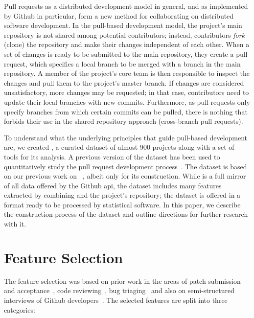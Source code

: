\documentclass{sig-alternate}
\begin{document}
Pull requests as a distributed development model in general, and as implemented
by Github in particular, form a new method for collaborating on distributed
software development. In the pull-based development model, the project's main
repository is not shared among potential contributors; instead, contributors
\emph{fork} (clone) the repository and make their changes independent of each
other. When a set of changes is ready to be submitted to the main repository,
they create a pull request, which specifies a local branch to be merged with a
branch in the main repository. A member of the project's core team is then
responsible to inspect the changes and pull them to the project's master branch.
If changes are considered unsatisfactory, more changes may be requested; in that
case, contributors need to update their local branches with new commits.
Furthermore, as pull requests only specify branches from which certain commits
can be pulled, there is nothing that forbids their use in the shared 
repository approach (cross-branch pull requests).

To understand what the underlying principles that guide pull-based development
are, we created \pullreqs, a curated dataset of almost 900 projects along with a
set of tools for its analysis. A previous version of the dataset has been used
to quantitatively study the pull request development process~\cite{GPD14}. The
\pullreqs dataset is based on our previous work on \ghtorrent~\cite{Gousi13},
albeit only for its construction. While \ghtorrent is a full mirror of all
data offered by the Github {\sc api}, the \pullreqs dataset includes many features extracted by combining \ghtorrent and the project's repository; the dataset is offered in a format ready to be processed by statistical software.
In this paper, we describe the construction
process of the dataset and outline directions for further research with it.

\section{Feature Selection}
\label{sec:expdata}

The feature selection was based on prior work in the areas of patch submission
and acceptance~\cite{Nagap05,Bird07a,Weiss08,Baysa12}, code
reviewing~\cite{Rigby13}, bug triaging~\cite{Anvik06, Giger10} and also
on semi-structured interviews of Github developers~\cite{Dabbi12, Pham13}. The
selected features are split into three categories:
\end{document}
